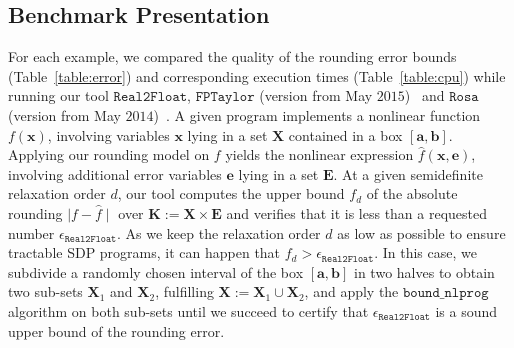 \documentclass[preprint,fleqn,nocopyrightspace]{sigplanconf}
\newcommand{\x}{\mathbf{x}}
\newcommand{\e}{\mathbf{e}}
\renewcommand{\b}{\mathbf{b}}
\def\a{\mathbf{a}}
\def\E{\mathbf{E}}
\def\K{\mathbf{K}}
\def\X{\mathbf{X}}
\newcommand{\boundnlprog}{\mathtt{bound\_nlprog}}
\newcommand{\realtofloat}{\mathtt{Real2Float}}
\newcommand{\rosa}{\mathtt{Rosa}}
\newcommand{\fptaylor}{\mathtt{FPTaylor}}
\theoremstyle{plain}
\begin{document}
\subsection{Benchmark Presentation}
For each example, we compared the quality of the rounding error bounds (Table~\ref{table:error}) and corresponding execution times (Table~\ref{table:cpu}) while running our tool $\realtofloat$, $\fptaylor$ (version from May $2015$)~\cite{fptaylor15} and $\rosa$ (version from  May $2014$)~\cite{Darulova14Popl}.
A given program implements a nonlinear function $f(\x)$, involving variables $\x$ lying in a set $\X$ contained in a box $[\a, \b]$.
Applying our rounding model on $f$ yields the nonlinear expression $\hat{f}(\x,\e)$, involving additional error variables $\e$ lying in a set $\E$. 
At a given semidefinite relaxation order $d$, our tool computes the upper bound $f_d$ of the absolute rounding $\mid f - \hat{f} \mid $ over $\K := \X \times \E$ and verifies that it is less than a requested number $\epsilon_{\realtofloat}$. As we keep the relaxation order $d$ as low as possible to ensure tractable SDP programs, it can happen that $f_d > \epsilon_{\realtofloat}$. 
 In this case, we subdivide a randomly chosen interval of the box  $[\a, \b]$ in two halves to obtain two sub-sets $\X_1$ and $\X_2$, fulfilling $\X := \X_1 \cup \X_2$, and apply the $\boundnlprog$ algorithm on both sub-sets until we succeed to certify that $\epsilon_{\realtofloat}$ is a sound upper bound of the rounding error.
\end{document}
